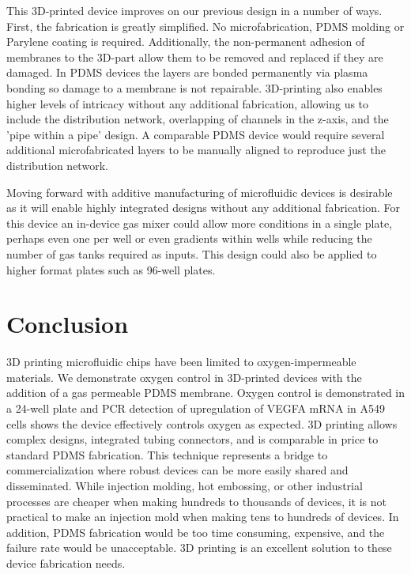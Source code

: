 \documentclass[10pt,letterpaper]{article}
\begin{document}
This 3D-printed device improves on our previous design in a number of ways.
First, the fabrication is greatly simplified. 
No microfabrication, PDMS molding or Parylene coating is required.
Additionally, the non-permanent adhesion of membranes to the 3D-part allow them to be removed and replaced if they are damaged.
In PDMS devices the layers are bonded permanently via plasma bonding so damage to a membrane is not repairable.
3D-printing also enables higher levels of intricacy without any additional fabrication, allowing us to include the distribution network, overlapping of channels in the z-axis, and the 'pipe within a pipe' design. 
A comparable PDMS device would require several additional microfabricated layers to be manually aligned to reproduce just the distribution network.

Moving forward with additive manufacturing of microfluidic devices is desirable as it will enable highly integrated designs without any additional fabrication.
For this device an in-device gas mixer could allow more conditions in a single plate, perhaps even one per well or even gradients within wells while reducing the number of gas tanks required as inputs.
This design could also be applied to higher format plates such as 96-well plates.

\section*{Conclusion}
3D printing microfluidic chips have been limited to oxygen-impermeable materials.
We demonstrate oxygen control in 3D-printed devices with the addition of a gas permeable PDMS membrane. 
Oxygen control is demonstrated in a 24-well plate and PCR detection of upregulation of VEGFA mRNA in A549 cells shows the device effectively controls oxygen as expected. 
3D printing allows complex designs, integrated tubing connectors, and is comparable in price to standard PDMS fabrication. 
This technique represents a bridge to commercialization where robust devices can be more easily shared and disseminated. 
While injection molding, hot embossing, or other industrial processes are cheaper when making hundreds to thousands of devices, it is not practical to make an injection mold when making tens to hundreds of devices. 
In addition, PDMS fabrication would be too time consuming, expensive, and the failure rate would be unacceptable. 3D printing is an excellent solution to these device fabrication needs.
\end{document}
